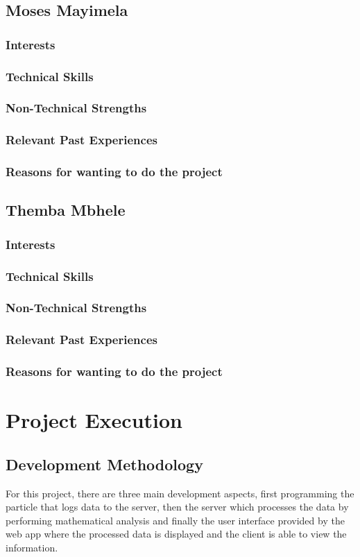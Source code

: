 \documentclass[a4paper,12pt]{article}
\begin{document}
\subsection{Moses Mayimela}
\subsubsection{Interests}
\subsubsection{Technical Skills}
\subsubsection{Non-Technical Strengths}
\subsubsection{Relevant Past Experiences}
\subsubsection{Reasons for wanting to do the project}
\subsection{Themba Mbhele}
\subsubsection{Interests}
\subsubsection{Technical Skills}
\subsubsection{Non-Technical Strengths}
\subsubsection{Relevant Past Experiences}
\subsubsection{Reasons for wanting to do the project}
\section{Project Execution}
\subsection{Development Methodology}
For this project, there are three main development aspects, first programming the particle that logs data to the server, then the server which processes the data by performing mathematical analysis and finally the user interface provided by the web app where the processed data is displayed and the client is able to view the information.\\
\end{document}
